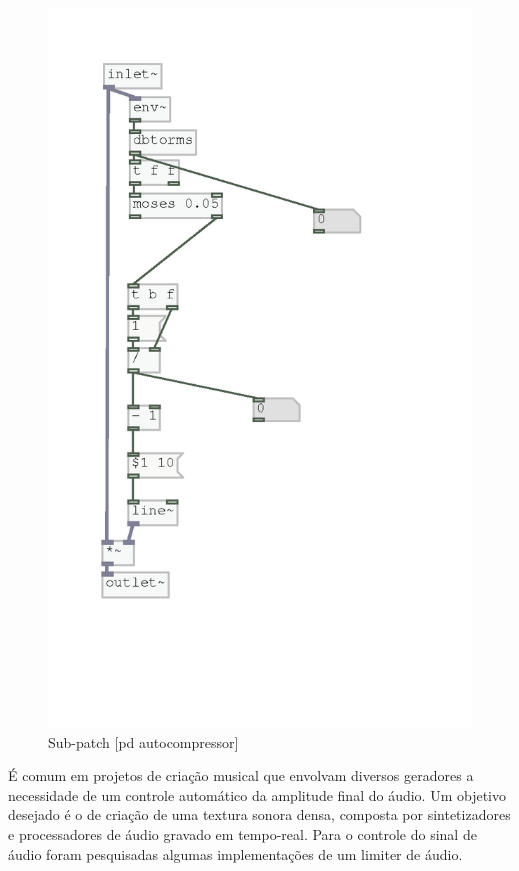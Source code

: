 \documentclass[draft]{ppgmus}
\begin{document}
\begin{figure}
\includegraphics[scale=.6]{autolimiter}
\caption{Sub-patch [pd autocompressor]}
\label{autolimiter}
\end{figure}

É comum em projetos de criação musical que envolvam diversos geradores a necessidade de um
controle automático da amplitude final do áudio. 
Um objetivo desejado é o de criação de uma textura sonora densa, composta por sintetizadores e 
processadores de áudio gravado em tempo-real. Para o controle do sinal de áudio foram pesquisadas
algumas implementações de um limiter de áudio. 
\end{document}
